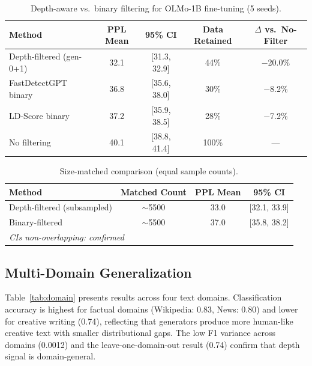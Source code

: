 \documentclass[letterpaper]{article}
\begin{document}
\begin{table}[t]
\centering
\caption{Depth-aware vs.\ binary filtering for OLMo-1B fine-tuning (5 seeds).}
\label{tab:filtering}
\begin{tabular}{lcccc}
\toprule
Method & PPL Mean & 95\% CI & Data Retained & $\Delta$ vs.\ No-Filter \\
\midrule
Depth-filtered (gen-0+1) & 32.1 & [31.3, 32.9] & 44\% & $-$20.0\% \\
FastDetectGPT binary & 36.8 & [35.6, 38.0] & 30\% & $-$8.2\% \\
LD-Score binary & 37.2 & [35.9, 38.5] & 28\% & $-$7.2\% \\
No filtering & 40.1 & [38.8, 41.4] & 100\% & --- \\
\bottomrule
\end{tabular}
\end{table}

\begin{table}[t]
\centering
\caption{Size-matched comparison (equal sample counts).}
\label{tab:sizematch}
\begin{tabular}{lccc}
\toprule
Method & Matched Count & PPL Mean & 95\% CI \\
\midrule
Depth-filtered (subsampled) & ${\sim}$5500 & 33.0 & [32.1, 33.9] \\
Binary-filtered & ${\sim}$5500 & 37.0 & [35.8, 38.2] \\
\midrule
\multicolumn{4}{l}{\textit{CIs non-overlapping: confirmed}} \\
\bottomrule
\end{tabular}
\end{table}

\subsection{Multi-Domain Generalization}
\label{sec:domain}

Table~\ref{tab:domain} presents results across four text domains.
Classification accuracy is highest for factual domains (Wikipedia: 0.83, News: 0.80) and lower for creative writing (0.74), reflecting that generators produce more human-like creative text with smaller distributional gaps.
The low F1 variance across domains (0.0012) and the leave-one-domain-out result (0.74) confirm that depth signal is domain-general.
\end{document}

